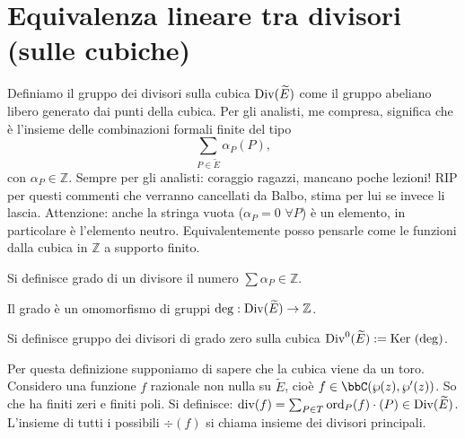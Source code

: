 \section{Equivalenza lineare tra divisori (sulle cubiche)}

\begin{definizione}
Definiamo il gruppo dei divisori sulla cubica $\mbox{Div}(\widetilde{E})$ come il gruppo abeliano libero generato dai punti della cubica. Per gli analisti, me compresa, significa che è l'insieme delle combinazioni formali finite del tipo
	\[
		\sum_{P \in \widetilde{E}} \alpha_P(P),
	\]
con $\alpha_P \in \mathbb{Z}$.
Sempre per gli analisti: coraggio ragazzi, mancano poche lezioni!
RIP per questi commenti che verranno cancellati da Balbo, stima per lui se invece li lascia.
Attenzione: anche la stringa vuota ($\alpha_P=0$ $\forall P$) è un elemento, in particolare è l'elemento neutro.
Equivalentemente posso pensarle come le funzioni dalla cubica in $\mathbb{Z}$ a supporto finito.
\end{definizione}

\begin{definizione}
Si definisce grado di un divisore il numero $\sum \alpha_P \in \mathbb{Z}$.
\end{definizione} 

\begin{osservazione}Il grado è un omomorfismo di gruppi $\deg: \mbox{Div}(\widetilde{E}) \rightarrow \mathbb{Z}$.
\end{osservazione}

\begin{definizione}
Si definisce gruppo dei divisori di grado zero sulla cubica $\mbox{Div}^0(\widetilde{E}) := \mbox{Ker }(\deg)$.
\end{definizione}

\begin{definizione}
Per questa definizione supponiamo di sapere che la cubica viene da un toro.
Considero una funzione $f$ razionale non nulla su $\widetilde{E}$, cioè $f \in \bbC(\wp(z),\wp'(z))$. So che ha finiti zeri e finiti poli.
Si definisce: $\mbox{div}(f) = \sum_{P\in T} \text{ord}_P(f) \cdot (P) \in \mbox{Div}(\widetilde E)$.
L'insieme di tutti i possibili $\div(f)$ si chiama insieme dei divisori principali.
\end{definizione}

